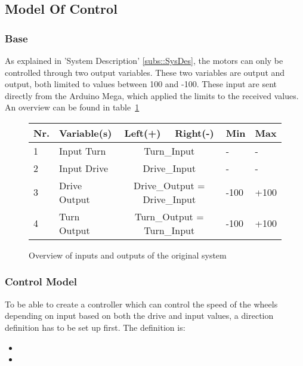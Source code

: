 \subsection{Model Of Control}
\subsubsection{Base}
As explained in 'System Description' \ref{subs::SysDes}, the motors can only be controlled through two output variables.
These two variables are  output and  output, both limited to values between 100 and -100.
These input are sent directly from the Arduino Mega, which applied the limits to the received values.
An overview can be found in table~\ref{tab::varoverview}
\begin{figure}[H]
\centering
\begin{tabular}{|l|l|c|c|l|l|}
\hline
\textbf{Nr.} & \textbf{Variable(s)} & \textbf{Left(+)} & \textbf{Right(-)} & \textbf{Min} & \textbf{Max} \\ \hline
1 & Input Turn 	& \multicolumn{2}{c|}{Turn\_Input} 				& - 		& -		\\ \hline
2 & Input Drive 	& \multicolumn{2}{c|}{Drive\_Input} 				& - 		& - 		\\ \hline
3 & Drive Output & \multicolumn{2}{c|}{Drive\_Output = Drive\_Input}	& -100 	& +100 	\\ \hline
4 & Turn Output 	& \multicolumn{2}{c|}{Turn\_Output = Turn\_Input}	& -100	& +100	\\ \hline
\end{tabular}
\caption{Overview of inputs and outputs of the original system}
\label{tab::varoverview}
\end{figure}


\subsubsection{Control Model}
To be able to create a controller which can control the speed of the wheels depending on input based on both the drive and input values, a direction definition has to be set up first.
The definition is:

\begin{itemize}
\item {}
\item {}
\end{itemize}

